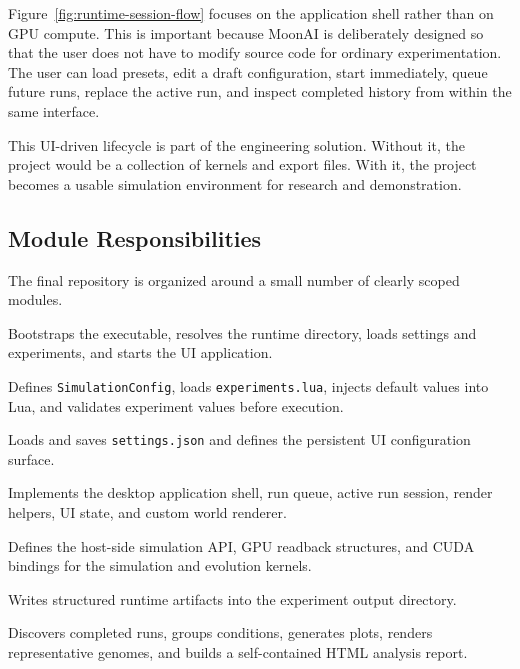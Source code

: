 Figure~\ref{fig:runtime-session-flow} focuses on the application shell rather than on GPU
compute. This is important because MoonAI is deliberately designed so that the user does not
have to modify source code for ordinary experimentation. The user can load presets, edit a draft
configuration, start immediately, queue future runs, replace the active run, and inspect
completed history from within the same interface.

This UI-driven lifecycle is part of the engineering solution. Without it, the project would be a
collection of kernels and export files. With it, the project becomes a usable simulation
environment for research and demonstration.

\subsection{Module Responsibilities}

The final repository is organized around a small number of clearly scoped modules.

\begin{description}[style=nextline,leftmargin=3.6cm,font=\normalfont\ttfamily]
  \item[main.rs] Bootstraps the executable, resolves the runtime directory, loads settings and
  experiments, and starts the UI application.

  \item[experiment.rs] Defines \texttt{SimulationConfig}, loads \texttt{experiments.lua},
  injects default values into Lua, and validates experiment values before execution.

  \item[settings.rs] Loads and saves \texttt{settings.json} and defines the persistent UI
  configuration surface.

  \item[src/ui/] Implements the desktop application shell, run queue, active run session, render
  helpers, UI state, and custom world renderer.

  \item[src/sim/] Defines the host-side simulation API, GPU readback structures, and CUDA
  bindings for the simulation and evolution kernels.

  \item[metrics.rs] Writes structured runtime artifacts into the experiment output directory.

  \item[analysis/] Discovers completed runs, groups conditions, generates plots, renders
  representative genomes, and builds a self-contained HTML analysis report.
\end{description}

